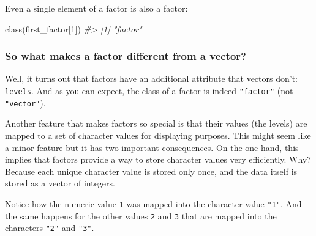 \documentclass[
]{book}
\newenvironment{Shaded}{\begin{snugshade}}{\end{snugshade}}
\newcommand{\CommentTok}[1]{\textcolor[rgb]{0.56,0.35,0.01}{\textit{#1}}}
\newcommand{\DecValTok}[1]{\textcolor[rgb]{0.00,0.00,0.81}{#1}}
\newcommand{\FunctionTok}[1]{\textcolor[rgb]{0.00,0.00,0.00}{#1}}
\newcommand{\NormalTok}[1]{#1}
\begin{document}
Even a single element of a factor is also a factor:

\begin{Shaded}
\begin{Highlighting}[]
\FunctionTok{class}\NormalTok{(first\_factor[}\DecValTok{1}\NormalTok{])}
\CommentTok{\#\textgreater{} [1] "factor"}
\end{Highlighting}
\end{Shaded}

\hypertarget{so-what-makes-a-factor-different-from-a-vector}{%
\subsubsection*{So what makes a factor different from a vector?}\label{so-what-makes-a-factor-different-from-a-vector}}

Well, it turns out that factors have an additional attribute that vectors don't:
\texttt{levels}. And as you can expect, the class of a factor is indeed \texttt{"factor"}
(not \texttt{"vector"}).

\begin{Shaded}
\end{Shaded}

Another feature that makes factors so special is that their values (the levels)
are mapped to a set of character values for displaying purposes. This might
seem like a minor feature but it has two important consequences. On the one
hand, this implies that factors provide a way to store character values very
efficiently. Why? Because each unique character value is stored only once, and
the data itself is stored as a vector of integers.

Notice how the numeric value \texttt{1} was mapped into the character value \texttt{"1"}. And
the same happens for the other values \texttt{2} and \texttt{3} that are mapped into the
characters \texttt{"2"} and \texttt{"3"}.
\end{document}

